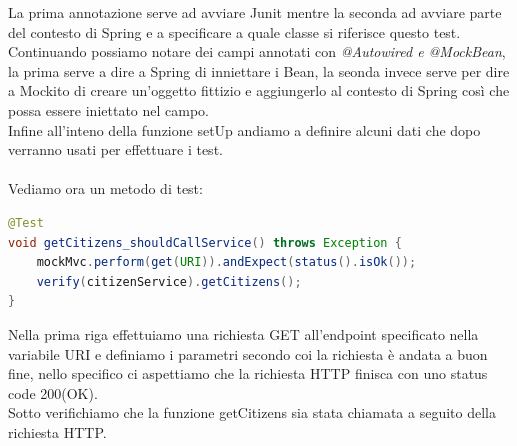 \documentclass[a4paper,12pt,openany,oneside]{book}
\begin{document}
La prima annotazione serve ad avviare Junit mentre la seconda ad avviare parte del contesto di Spring e a specificare a quale classe si riferisce questo test.\\
Continuando possiamo notare dei campi annotati con \textit{@Autowired e @MockBean}, la prima serve a dire a Spring di inniettare i Bean, la seonda invece serve per dire a Mockito di creare un'oggetto fittizio e aggiungerlo al contesto di Spring così che possa essere iniettato nel campo.
\\Infine all'inteno della funzione setUp andiamo a definire alcuni dati che dopo verranno usati per effettuare i test.\\\\
Vediamo ora un metodo di test:
\begin{lstlisting}[language=Java]
@Test
void getCitizens_shouldCallService() throws Exception {
    mockMvc.perform(get(URI)).andExpect(status().isOk());
    verify(citizenService).getCitizens();
}
\end{lstlisting}
Nella prima riga effettuiamo una richiesta GET all'endpoint specificato nella variabile URI e definiamo i parametri secondo coi la richiesta è andata a buon fine, nello specifico ci aspettiamo che la richiesta HTTP finisca con uno status code 200(OK).\\
Sotto verifichiamo che la funzione getCitizens sia stata chiamata a seguito della richiesta HTTP.
\newpage
\end{document}
